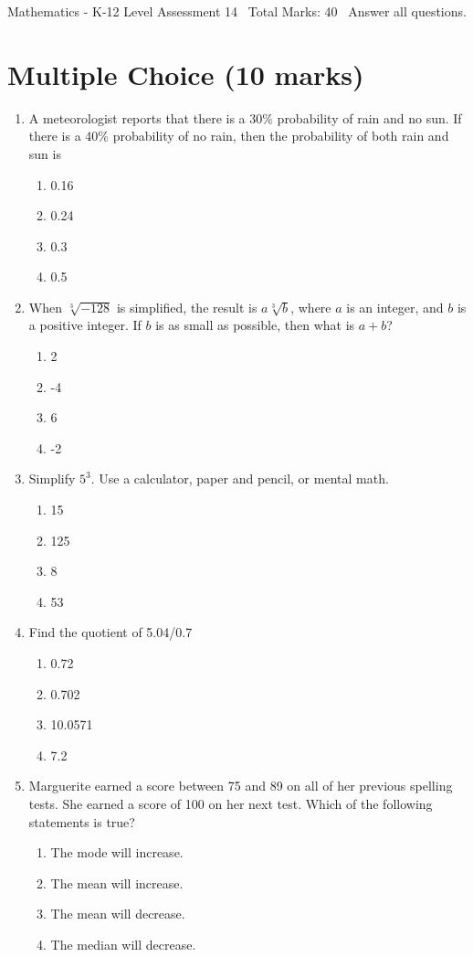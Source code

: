 \documentclass[12pt]{article}
\begin{document}
\begin{center}
Mathematics - K-12 Level Assessment 14 \
Total Marks: 40 \
Answer all questions.
\end{center}

\section*{Multiple Choice (10 marks)}
\begin{enumerate}[label=\arabic*.]
\item A meteorologist reports that there is a 30\% probability of rain and no sun. If there is a 40\% probability of no rain, then the probability of both rain and sun is
\begin{enumerate}[label=(\alph*)]
    \item 0.16
    \item 0.24
    \item 0.3
    \item 0.5
\end{enumerate}
\item When $\sqrt[3]{-128}$ is simplified, the result is $a\sqrt[3]{b}$, where $a$ is an integer, and $b$ is a positive integer. If $b$ is as small as possible, then what is $a+b$?
\begin{enumerate}[label=(\alph*)]
    \item 2
    \item -4
    \item 6
    \item -2
\end{enumerate}
\item Simplify $5^3$. Use a calculator, paper and pencil, or mental math.
\begin{enumerate}[label=(\alph*)]
    \item 15
    \item 125
    \item 8
    \item 53
\end{enumerate}
\item Find the quotient of 5.04/0.7
\begin{enumerate}[label=(\alph*)]
    \item 0.72
    \item 0.702
    \item 10.0571
    \item 7.2
\end{enumerate}
\item Marguerite earned a score between 75 and 89 on all of her previous spelling tests. She earned a score of 100 on her next test. Which of the following statements is true?
\begin{enumerate}[label=(\alph*)]
    \item The mode will increase.
    \item The mean will increase.
    \item The mean will decrease.
    \item The median will decrease.
\end{enumerate}
\end{enumerate}
\end{document}
